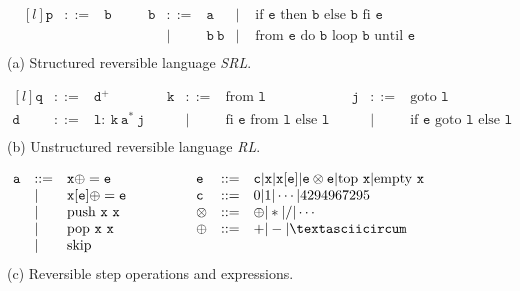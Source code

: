 \begin{figure}[ht]

  \begin{minipage}{\textwidth}
    \center
    $$\begin{matrix*}[l]
      \mathtt{p} & ::= & \mathtt{b} & \quad & \mathtt{b} & ::= & \mathtt{a}             & | & \text{ if }\mathtt{e}\text{ then }\mathtt{b}\text{ else }\mathtt{b}\text{ fi }\mathtt{e}\\
                 &     &           &        &            &  |  & \mathtt{b}\ \mathtt{b} & | & \text{ from }\mathtt{e}\text{ do }\mathtt{b}\text{ loop }\mathtt{b}\text{ until }\mathtt{e}\\
    \end{matrix*}$$
    (a) Structured reversible language \textit{SRL}.
  \end{minipage}

  \begin{minipage}{\textwidth}
    \center
    $$\begin{matrix*}[l]
      \mathtt{q} & ::= & \mathtt{d}^+                                      & & \mathtt{k} & ::= & \text{from }\mathtt{l} & & \mathtt{j} & ::= & \text{goto }\mathtt{l}\\
      \mathtt{d} & ::= & \mathtt{l}:\ \mathtt{k}\ \mathtt{a}^*\ \mathtt{j} &       &            &  |  & \text{fi }\mathtt{e}\text{ from }\mathtt{l}\text{ else }\mathtt{l} &   
        & & | & \text{if }\mathtt{e}\text{ goto }\mathtt{l}\text{ else }\mathtt{l}\\
    \end{matrix*}$$
    (b) Unstructured reversible language \textit{RL}.
  \end{minipage}

  \begin{minipage}{\textwidth}
    \center
    $$\begin{matrix*}[l]
      \mathtt{a} & ::= & \mathtt{x}\oplus=\mathtt{e} & \quad\quad\quad & \mathtt{e} & ::= & \mathtt{c}|\mathtt{x}|\mathtt{x}[\mathtt{e}]|\mathtt{e}\otimes\mathtt{e}|\text{top }\mathtt{x}|\text{empty }\mathtt{x}\\
                 &  |  & \mathtt{x}[\mathtt{e}]\oplus=\mathtt{e} &     & \mathtt{c} & ::= & 0|1|\cdots|4294967295\\
                 &  |  & \text{push }\mathtt{x}\ \mathtt{x}      &     & \otimes    & ::= & \oplus|*|/|\cdots\\
                 &  |  & \text{pop  }\mathtt{x}\ \mathtt{x}      &     & \oplus     & ::= & + | - | \textasciicircum\\
                 &  |  & \text{skip}\\
    \end{matrix*}$$
    (c) Reversible step operations and expressions.
  \end{minipage}


\end{figure}

